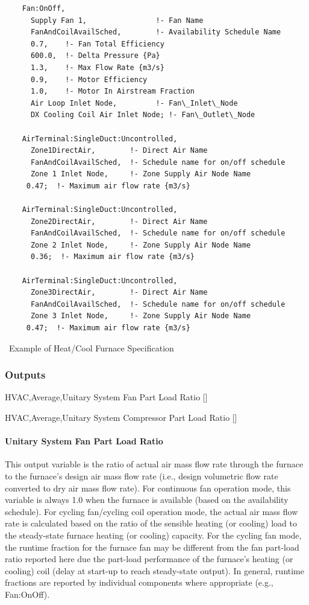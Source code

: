 \begin{lstlisting}
    Fan:OnOff,
      Supply Fan 1,                !- Fan Name
      FanAndCoilAvailSched,        !- Availability Schedule Name
      0.7,    !- Fan Total Efficiency
      600.0,  !- Delta Pressure {Pa}
      1.3,    !- Max Flow Rate {m3/s}
      0.9,    !- Motor Efficiency
      1.0,    !- Motor In Airstream Fraction
      Air Loop Inlet Node,         !- Fan\_Inlet\_Node
      DX Cooling Coil Air Inlet Node; !- Fan\_Outlet\_Node

    AirTerminal:SingleDuct:Uncontrolled,
      Zone1DirectAir,        !- Direct Air Name
      FanAndCoilAvailSched,  !- Schedule name for on/off schedule
      Zone 1 Inlet Node,     !- Zone Supply Air Node Name
     0.47;  !- Maximum air flow rate {m3/s}

    AirTerminal:SingleDuct:Uncontrolled,
      Zone2DirectAir,        !- Direct Air Name
      FanAndCoilAvailSched,  !- Schedule name for on/off schedule
      Zone 2 Inlet Node,     !- Zone Supply Air Node Name
      0.36;  !- Maximum air flow rate {m3/s}

    AirTerminal:SingleDuct:Uncontrolled,
      Zone3DirectAir,        !- Direct Air Name
      FanAndCoilAvailSched,  !- Schedule name for on/off schedule
      Zone 3 Inlet Node,     !- Zone Supply Air Node Name
     0.47;  !- Maximum air flow rate {m3/s}
\end{lstlisting}

~Example of Heat/Cool Furnace Specification

\subsubsection{Outputs}\label{outputs-1-029}

HVAC,Average,Unitary System Fan Part Load Ratio {[]}

HVAC,Average,Unitary System Compressor Part Load Ratio {[]}

\paragraph{Unitary System Fan Part Load Ratio}\label{unitary-system-fan-part-load-ratio-1}

This output variable is the ratio of actual air mass flow rate through the furnace to the furnace's design air mass flow rate (i.e., design volumetric flow rate converted to dry air mass flow rate). For continuous fan operation mode, this variable is always 1.0 when the furnace is available (based on the availability schedule). For cycling fan/cycling coil operation mode, the actual air mass flow rate is calculated based on the ratio of the sensible heating (or cooling) load to the steady-state furnace heating (or cooling) capacity. For the cycling fan mode, the runtime fraction for the furnace fan may be different from the fan part-load ratio reported here due the part-load performance of the furnace's heating (or cooling) coil (delay at start-up to reach steady-state output). In general, runtime fractions are reported by individual components where appropriate (e.g., Fan:OnOff).


